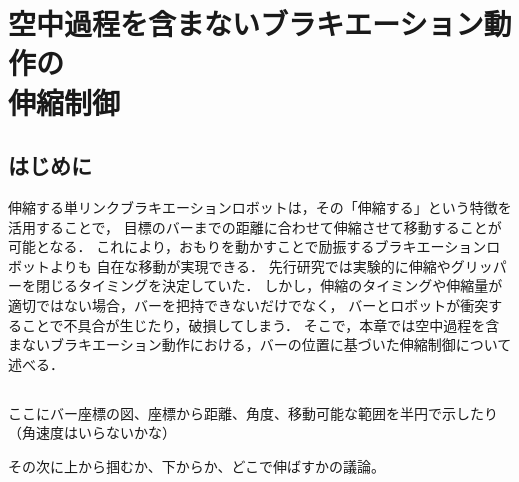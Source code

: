 \chapter[空中過程を含まないブラキエーション動作の伸縮制御]%
{空中過程を含まないブラキエーション動作の\\伸縮制御}
        \section{はじめに}
        
        伸縮する単リンクブラキエーションロボットは，その「伸縮する」という特徴を活用することで，
        目標のバーまでの距離に合わせて伸縮させて移動することが可能となる．
        これにより，おもりを動かすことで励振するブラキエーションロボット\cite{akahane2022single}よりも
        自在な移動が実現できる．
        先行研究\cite{Hijiri:Robomech2024}では実験的に伸縮やグリッパーを閉じるタイミングを決定していた．
        しかし，伸縮のタイミングや伸縮量が適切ではない場合，バーを把持できないだけでなく，
        バーとロボットが衝突することで不具合が生じたり，破損してしまう．
        そこで，本章では空中過程を含まないブラキエーション動作における，バーの位置に基づいた伸縮制御について述べる．
          
        \section{}

        ここにバー座標の図、座標から距離、角度、移動可能な範囲を半円で示したり（角速度はいらないかな）

        その次に上から掴むか、下からか、どこで伸ばすかの議論。

        

